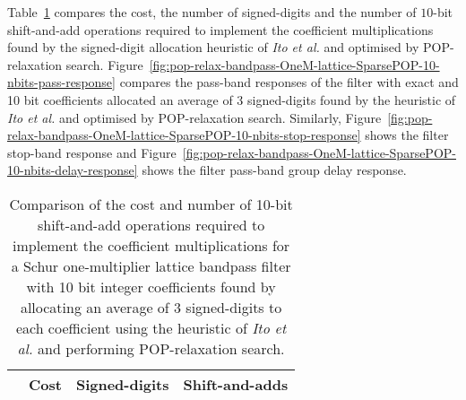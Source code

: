 \documentclass[a4paper,twoside,10pt,english]{report}
\begin{document}
Table~\ref{tab:pop-relax-bandpass-OneM-lattice-SparsePOP-10-nbits-cost-summary}
compares the cost, the number of signed-digits and the number of $10$-bit
shift-and-add operations required to implement the coefficient multiplications
found by the signed-digit allocation heuristic of \emph{Ito et al.} and
optimised by POP-relaxation search. 
Figure~\ref{fig:pop-relax-bandpass-OneM-lattice-SparsePOP-10-nbits-pass-response}
compares the pass-band responses of the filter with exact and 10 bit
coefficients allocated an average of 3 signed-digits found by the heuristic of
\emph{Ito et al.} and optimised by POP-relaxation search. Similarly,
Figure~\ref{fig:pop-relax-bandpass-OneM-lattice-SparsePOP-10-nbits-stop-response}
shows the filter stop-band response and
Figure~\ref{fig:pop-relax-bandpass-OneM-lattice-SparsePOP-10-nbits-delay-response}
shows the filter pass-band group delay response.

\begin{table}[!htbp]
\centering
\begin{threeparttable}
\begin{tabular}{lccc}  \\ \toprule
& Cost&Signed-digits&Shift-and-adds\\ \midrule

\bottomrule
\end{tabular}
\end{threeparttable}
\caption[Summary of cost results for the Schur one-multiplier lattice bandpass
filter POP-relaxation example with 10 bit 3 signed digit coefficients]
{Comparison of the cost and number of 10-bit shift-and-add operations required
  to implement the coefficient multiplications for a Schur one-multiplier
  lattice bandpass filter with 10 bit integer coefficients found by allocating
  an average of 3 signed-digits to each coefficient using the heuristic of
  \emph{Ito et al.}  and performing POP-relaxation search.}
\label{tab:pop-relax-bandpass-OneM-lattice-SparsePOP-10-nbits-cost-summary}
\end{table}
\end{document}
